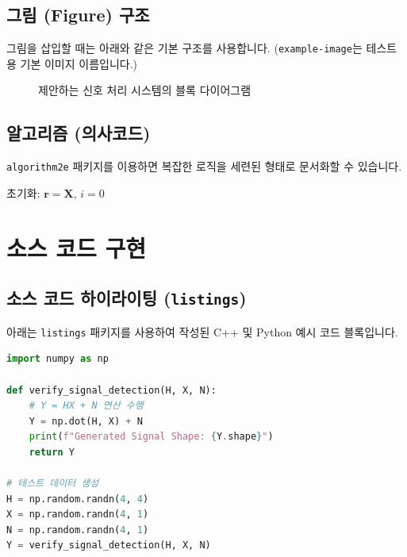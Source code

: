 \documentclass[11pt,a4paper,oneside]{memoir}
\begin{document}
\section{그림 (Figure) 구조}
그림을 삽입할 때는 아래와 같은 기본 구조를 사용합니다. (\texttt{example-image}는 테스트용 기본 이미지 이름입니다.)

\begin{figure}[htbp]
\centering
\caption{제안하는 신호 처리 시스템의 블록 다이어그램}
\label{fig:diagram}
\end{figure}

\section{알고리즘 (의사코드)}
\texttt{algorithm2e} 패키지를 이용하면 복잡한 로직을 세련된 형태로 문서화할 수 있습니다.

\begin{algorithm}[H]
\DontPrintSemicolon
\SetAlgoLined
{}
\BlankLine
초기화: $\mathbf{r} = \mathbf{X}$, $i = 0$\;
\;
\caption{최소 잔차 기반 신호 검출 알고리즘}
\label{alg:detection}
\end{algorithm}


\chapter{소스 코드 구현}

\section{소스 코드 하이라이팅 (\texttt{listings})}
아래는 \texttt{listings} 패키지를 사용하여 작성된 C++ 및 Python 예시 코드 블록입니다.

\begin{lstlisting}[language=Python, caption={Python을 이용한 행렬 곱 계산 및 수식 검증}]
import numpy as np

def verify_signal_detection(H, X, N):
    # Y = HX + N 연산 수행
    Y = np.dot(H, X) + N
    print(f"Generated Signal Shape: {Y.shape}")
    return Y

# 테스트 데이터 생성
H = np.random.randn(4, 4)
X = np.random.randn(4, 1)
N = np.random.randn(4, 1)
Y = verify_signal_detection(H, X, N)
\end{lstlisting}
\end{document}
